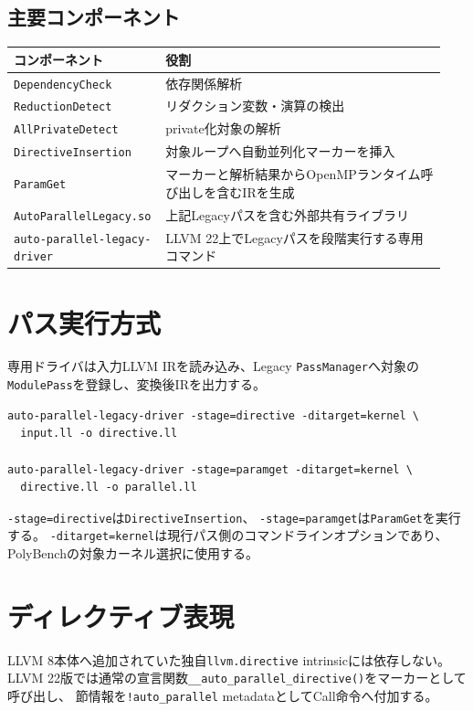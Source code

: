 \documentclass[a4paper,11pt]{ltjsarticle}
\begin{document}
\subsection{主要コンポーネント}
\begin{longtable}{p{0.30\linewidth}p{0.64\linewidth}}
\toprule
コンポーネント & 役割 \\
\midrule
\endhead
\texttt{DependencyCheck} & 依存関係解析 \\
\texttt{ReductionDetect} & リダクション変数・演算の検出 \\
\texttt{AllPrivateDetect} & private化対象の解析 \\
\texttt{DirectiveInsertion} & 対象ループへ自動並列化マーカーを挿入 \\
\texttt{ParamGet} & マーカーと解析結果からOpenMPランタイム呼び出しを含むIRを生成 \\
\texttt{AutoParallelLegacy.so} & 上記Legacyパスを含む外部共有ライブラリ \\
\texttt{auto-parallel-legacy-driver} & LLVM 22上でLegacyパスを段階実行する専用コマンド \\
\bottomrule
\end{longtable}

\section{パス実行方式}
専用ドライバは入力LLVM IRを読み込み、Legacy \texttt{PassManager}へ対象の
\texttt{ModulePass}を登録し、変換後IRを出力する。

\begin{lstlisting}
auto-parallel-legacy-driver -stage=directive -ditarget=kernel \
  input.ll -o directive.ll

auto-parallel-legacy-driver -stage=paramget -ditarget=kernel \
  directive.ll -o parallel.ll
\end{lstlisting}

\texttt{-stage=directive}は\texttt{DirectiveInsertion}、
\texttt{-stage=paramget}は\texttt{ParamGet}を実行する。
\texttt{-ditarget=kernel}は現行パス側のコマンドラインオプションであり、
PolyBenchの対象カーネル選択に使用する。

\section{ディレクティブ表現}
LLVM 8本体へ追加されていた独自\texttt{llvm.directive} intrinsicには依存しない。
LLVM 22版では通常の宣言関数\texttt{\_\_auto\_parallel\_directive()}をマーカーとして呼び出し、
節情報を\texttt{!auto\_parallel} metadataとしてCall命令へ付加する。
\end{document}
